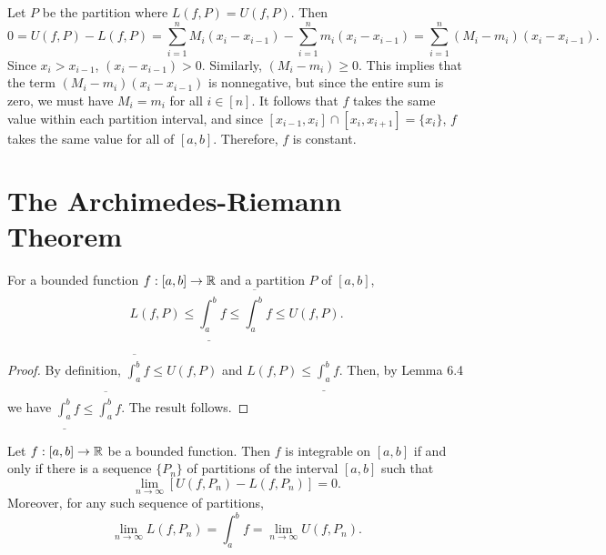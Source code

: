 \documentclass[letterpaper, twoside, 12pt]{book}
\begin{document}
\begin{solution}
    Let \(P\) be the partition where \(L(f, P) = U(f, P)\). Then
    \[ 0 = U(f, P) - L(f, P) = \sum_{i=1}^{n} M_i(x_{i} - x_{i-1}) -
                                \sum_{i = 1}^{n} m_i (x_{i} - x_{i-1}) 
                            = \sum_{i=1}^{n} (M_{i} - m_{i})(x_{i} - x_{i-1}) .\]
    Since \(x_{i} > x_{i-1}\), \((x_{i} - x_{i-1}) > 0\).  Similarly,
    \((M_{i} - m_{i}) \geq 0\). This implies that the term 
    \((M_{i} - m_{i})(x_{i} - x_{i-1})\) is nonnegative, but since 
    the entire sum is zero, we must have \(M_{i} = m_{i}\) for
    all \(i \in [n]\). It follows that \(f\) takes the same value
    within each partition interval, and since 
    \([x_{i - 1}, x_{i}] \cap [x_{i}, x_{i + 1}] = \{x_{i}\}\), \(f\)
    takes the same value for all of \([a,b]\). Therefore, \(f\)
    is constant.
\end{solution}




\section{The Archimedes-Riemann Theorem}


\begin{lemma}[6.7]
  For a bounded function \(f:[a,b]\to\mathbb R\) and a partition \(P\) of
  \([a,b]\),
  \[
    L(f,P)
      \leq
    \underline{\int_a^b}f\leq\overline{\int_a^b}f\leq U(f,P)
  .\]
\end{lemma}

\begin{proof}
    By definition, \(\overline{\int_a^b} f \leq U(f, P)\) and
    \(L(f, P) \leq \underline{\int_a^b} f\). Then, by Lemma 6.4
    we have \(\underline{\int_a^b} f \leq \overline{\int_a^b} f\).
    The result follows.
\end{proof}


\begin{theorem}
  Let \(f:[a,b]\to\mathbb R\) be a bounded function. Then \(f\) is integrable on
  \([a,b]\) if and only if there is a sequence \(\{P_n\}\) of partitions
  of the interval \([a,b]\) such that
  \[
    \lim_{n\to\infty}[U(f,P_n)-L(f,P_n)]=0
  .\]
  Moreover, for any such sequence of partitions,
  \[
    \lim_{n\to\infty} L(f,P_n)
      =
    \int_a^b f
      =
    \lim_{n\to\infty} U(f,P_n)
  .\]
\end{theorem}
\end{document}
